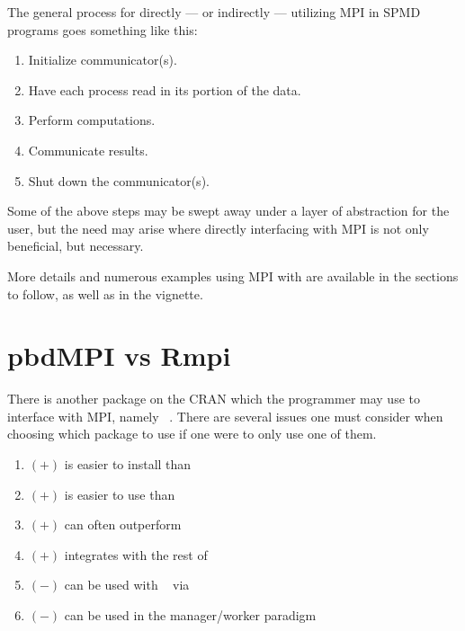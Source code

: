 The general process for directly --- or indirectly --- utilizing MPI in
SPMD programs goes something like this:

\begin{enumerate}
 \item Initialize communicator(s).
 \item Have each process read in its portion of the data.
 \item Perform computations.
 \item Communicate results.
 \item Shut down the communicator(s).
\end{enumerate}

Some of the above steps may be swept away under a layer of abstraction for
the user, but the need may arise where directly interfacing with MPI is not
only beneficial, but necessary.

More details and numerous examples using MPI with  are
available in the sections to follow, as well as in the 
vignette.





\section{pbdMPI vs Rmpi}

There is another package on the CRAN which the  programmer may
use to interface with MPI, namely
~\citep{Rmpi}. There are several issues
one must consider when choosing which package to use if one were to only
use one of them.
\begin{enumerate}
 \item $(+)$  is easier to install than 
 \item $(+)$  is easier to use than 
 \item\label{enum:perf} $(+)$  can often outperform 
 \item\label{enum:integrate} $(+)$  integrates with the rest of
 \item\label{enum:dompi} $(-)$  can be used with
      ~\citep{foreach} via
      ~\citep{dompi}
 \item $(-)$  can be used in the manager/worker paradigm
\end{enumerate}

